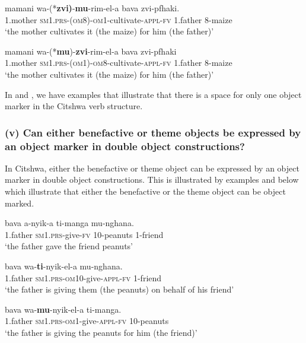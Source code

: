 \documentclass[output=paper]{langscibook}
\begin{document}
\ex\label{ex:ngunga:37b} \gll  mamani  wa-(*\textbf{zvi)}{}-\textbf{mu}-rim-el-a    bava      zvi-pfhaki.\\
1.mother    {\textsc{sm1}.\textsc{prs}}{}-({\textsc{om}8}){}-{\textsc{om}1}{}-cultivate-{\textsc{appl}}{}-{\textsc{fv}}  1.father  8-maize\\
\glt ‘the mother cultivates it (the maize) for him (the father)’

\ex\label{ex:ngunga:37c} \gll mamani  wa-(*\textbf{mu})-\textbf{zvi}{}-rim-el-a    bava    zvi-pfhaki\\
1.mother    {\textsc{sm1}.\textsc{prs}}{}-({\textsc{om}1}){}-{\textsc{om}8}{}-cultivate-{\textsc{appl}}{}-{\textsc{fv}}  1.father  8-maize\\
\glt ‘the mother cultivates it (the maize) for him (the father)’
    \z
\z

In  and , we have examples that illustrate that there is a space for only one object marker in the Citshwa verb structure. 

\subsubsection{(v) Can either benefactive or theme objects be expressed by an object marker in double object constructions?}

In Citshwa, either the benefactive or theme object can be expressed by an object marker in double object constructions. This is illustrated by examples  and  below which illustrate that either the benefactive or the theme object can be object marked. 

\ea\label{ex:ngunga:38}
\ea\label{ex:ngunga:38a} \gll bava    a-nyik-a  ti-manga  mu-nghana.\\
1.father  {\textsc{sm1}.\textsc{prs}}{}-give-{\textsc{fv}}  10-peanuts  1-friend\\
\glt ‘the father gave the friend peanuts’

\ex\label{ex:ngunga:38b} \gll bava    wa-\textbf{ti}{}-nyik-el-a    mu-nghana.\\
1.father  {\textsc{sm1}.\textsc{prs}}{}-{\textsc{om}10}{}-give-{\textsc{appl}}{}-{\textsc{fv}}  1-friend  \\
\glt ‘the father is giving them (the peanuts) on behalf of his friend’

\ex\label{ex:ngunga:38c} \gll bava    wa-\textbf{mu}{}-nyik-el-a    ti-manga.\\
1.father  {\textsc{sm1}.\textsc{prs}}{}-{\textsc{om}1}{}-give-{\textsc{appl}}{}-\textsc{fv}  10-peanuts\\
\glt ‘the father is giving the peanuts for him (the friend)’
    \z
\z
\end{document}
